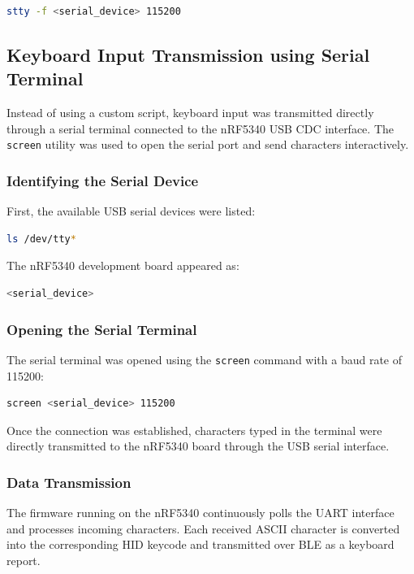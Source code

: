 \documentclass[conference]{IEEEtran}
\begin{document}
\begin{lstlisting}[language=bash]
stty -f <serial_device> 115200
\end{lstlisting}

\subsection{Keyboard Input Transmission using Serial Terminal}

Instead of using a custom script, keyboard input was transmitted directly through a serial terminal connected to the nRF5340 USB CDC interface. The \texttt{screen} utility was used to open the serial port and send characters interactively.

\subsubsection{Identifying the Serial Device}

First, the available USB serial devices were listed:

\begin{lstlisting}[language=bash]
ls /dev/tty*
\end{lstlisting}

The nRF5340 development board appeared as:

\begin{lstlisting}[language=bash]
<serial_device>
\end{lstlisting}

\subsubsection{Opening the Serial Terminal}

The serial terminal was opened using the \texttt{screen} command with a baud rate of 115200:

\begin{lstlisting}[language=bash]
screen <serial_device> 115200
\end{lstlisting}

Once the connection was established, characters typed in the terminal were directly transmitted to the nRF5340 board through the USB serial interface.

\subsubsection{Data Transmission}

The firmware running on the nRF5340 continuously polls the UART interface and processes incoming characters. Each received ASCII character is converted into the corresponding HID keycode and transmitted over BLE as a keyboard report.
\end{document}
